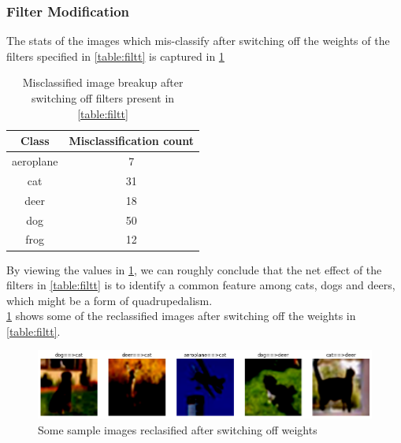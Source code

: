 \documentclass{article}
\begin{document}
\subsubsection{Filter Modification}
The stats of the images which mis-classify after switching off the weights of the filters specified in \cref{table:filtt} is captured in \cref{table:miscimgs}\\
\begin{table}[h!]
	\caption{Misclassified image breakup after switching off filters present in \cref{table:filtt}}
	\centering
	\begin{tabular}{|c | c|}
		\hline\hline
		Class & Misclassification count \\ [0.5ex]
		\hline
		 aeroplane & 7 \\
		       cat & 31 \\
		      deer & 18 \\
		       dog & 50 \\
			  frog & 12 \\ [1ex]
		\hline
	\end{tabular}
	\label{table:miscimgs}
\end{table}
By viewing the values in \cref{table:miscimgs}, we can roughly conclude that the net effect of the filters in \cref{table:filtt} is to identify a common feature among cats, dogs and deers, which might be a form of quadrupedalism.\\
\cref{fig:reclfgimgs} shows some of the reclassified images after switching off the weights in \cref{table:filtt}.
\begin{figure}[ht]
	\centering
	\includegraphics[scale=0.5]{../code/images/misclassified_switchoff.png}
	\caption{Some sample images reclasified after switching off weights}
	\label{fig:reclfgimgs}
\end{figure}

\end{document}
